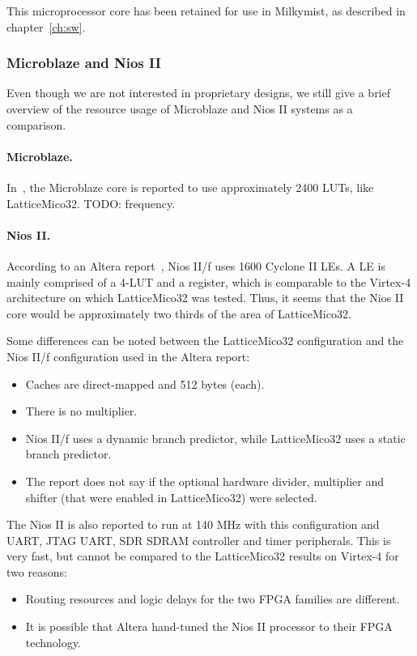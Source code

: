 \documentclass[a4paper,11pt]{kthesis}
\begin{document}
This microprocessor core has been retained for use in Milkymist, as described in chapter~\ref{ch:sw}.

\subsubsection{Microblaze and Nios II}
Even though we are not interested in proprietary designs, we still give a brief overview of the resource usage of Microblaze and Nios II systems as a comparison.

\paragraph{Microblaze.} In~\cite{softcorecomp}, the Microblaze core is reported to use approximately 2400 LUTs, like LatticeMico32. TODO: frequency.

\paragraph{Nios II.} According to an Altera report~\cite{niosbench}, Nios II/f uses 1600 Cyclone II LEs. A LE is mainly comprised of a 4-LUT and a register, which is comparable to the Virtex-4 architecture on which LatticeMico32 was tested. Thus, it seems that the Nios II core would be approximately two thirds of the area of LatticeMico32.

Some differences can be noted between the LatticeMico32 configuration and the Nios II/f configuration used in the Altera report:
\begin{itemize}
\item Caches are direct-mapped and 512 bytes (each).
\item There is no multiplier.
\item Nios II/f uses a dynamic branch predictor, while LatticeMico32 uses a static branch predictor.
\item The report does not say if the optional hardware divider, multiplier and shifter (that were enabled in LatticeMico32) were selected.
\end{itemize}

The Nios II is also reported to run at 140 MHz with this configuration and UART, JTAG UART, SDR SDRAM controller and timer peripherals. This is very fast, but cannot be compared to the LatticeMico32 results on Virtex-4 for two reasons:
\begin{itemize}
\item Routing resources and logic delays for the two FPGA families are different.
\item It is possible that Altera hand-tuned the Nios II processor to their FPGA technology.
\end{itemize}
\end{document}
